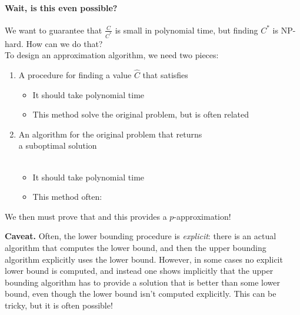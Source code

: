 \documentclass[11  pt]{article}
\begin{document}
	
	
	\newpage
	
	\paragraph{Wait, is this even possible?}
	We want to guarantee that $\frac{C}{C^*}$ is small in polynomial time, but finding $C^*$ is NP-hard. How can we do that? \\
	
	To design an approximation algorithm, we need two pieces:
	\begin{enumerate}
		\item {} A procedure for finding a value $\hat{C}$ that satisfies 
		\begin{itemize}
			\item It should take polynomial time \\
			\item This method  solve the original problem, but is often related
		\end{itemize}
		\item {} An algorithm for the original problem that returns \\
		
		a suboptimal solution  \\ \\
		\begin{itemize}
			\item It should take polynomial time \\
			\item This method often: \\
		\end{itemize}
	\end{enumerate}
	
	We then must prove that  and this provides a $p$-approximation! 
	
	\vfill
	
	
	\textbf{Caveat.} Often, the lower bounding procedure is \emph{explicit}: there is an actual algorithm that computes the lower bound, and then the upper bounding algorithm explicitly uses the lower bound. However, in some cases no explicit lower bound is computed, and instead one shows implicitly that the upper bounding algorithm has to provide a solution that is better than some lower bound, even though the lower bound isn't computed explicitly. This can be tricky, but it is often possible!
	
\end{document}
